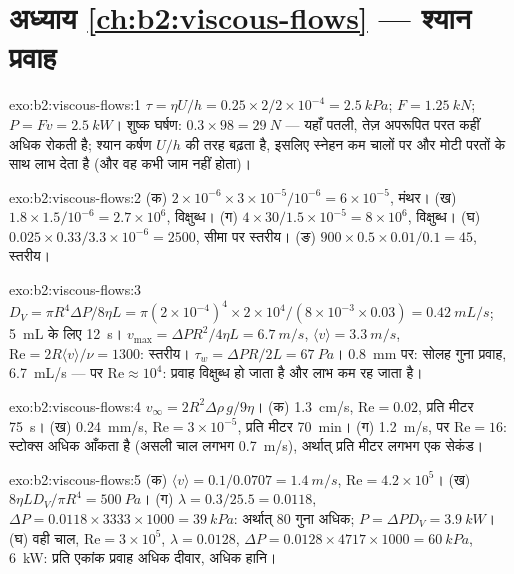 \section*{अध्याय \ref{ch:b2:viscous-flows} --- श्यान प्रवाह}

\begin{solution}{exo:b2:viscous-flows:1}
$\tau = \eta U/h = 0.25 \times 2/2 \times 10^{-4} = \qty{2.5}{kPa}$; $F = \qty{1.25}{kN}$;
$P = Fv = \qty{2.5}{kW}$। शुष्क घर्षण: $0.3 \times 98 = \qty{29}{N}$ --- यहाँ
पतली, तेज़ अपरूपित परत कहीं अधिक रोकती है; श्यान कर्षण
$U/h$ की तरह बढ़ता है, इसलिए स्नेहन कम चालों पर और मोटी परतों के साथ लाभ
देता है (और वह कभी जाम नहीं होता)।
\end{solution}

\begin{solution}{exo:b2:viscous-flows:2}
(क) $2 \times 10^{-6} \times 3 \times 10^{-5}/10^{-6} = 6 \times 10^{-5}$, मंथर। (ख)
$1.8 \times 1.5/10^{-6} = 2.7 \times 10^6$, विक्षुब्ध। (ग) $4 \times 30/1.5 \times 10^{-5}
= 8 \times 10^6$, विक्षुब्ध। (घ) $0.025 \times 0.33/3.3 \times 10^{-6} = 2500$,
सीमा पर स्तरीय। (ङ) $900 \times 0.5 \times 0.01/0.1 = 45$, स्तरीय।
\end{solution}

\begin{solution}{exo:b2:viscous-flows:3}
$D_V = \pi R^4\Delta P/8\eta L = \pi(2 \times 10^{-4})^4 \times 2 \times 10^4/(8 \times 10^{-3}
\times 0.03) = \qty{0.42}{mL/s}$; \qty{5}{mL} के लिए \qty{12}{s}। $v_{\max} = \Delta PR^2/
4\eta L = \qty{6.7}{m/s}$, $\langle v\rangle = \qty{3.3}{m/s}$, $\mathrm{Re} = 2R\langle v
\rangle/\nu = 1300$: स्तरीय। $\tau_w = \Delta PR/2L = \qty{67}{Pa}$। \qty{0.8}{mm} पर:
सोलह गुना प्रवाह, \qty{6.7}{mL/s} --- पर $\mathrm{Re} \approx 10^4$: प्रवाह
विक्षुब्ध हो जाता है और लाभ कम रह जाता है।
\end{solution}

\begin{solution}{exo:b2:viscous-flows:4}
$v_\infty = 2R^2\Delta\rho\,g/9\eta$। (क) \qty{1.3}{cm/s}, $\mathrm{Re} = 0.02$, प्रति मीटर
\qty{75}{s}। (ख) \qty{0.24}{mm/s}, $\mathrm{Re} = 3 \times 10^{-5}$, प्रति
मीटर \qty{70}{min}। (ग) \qty{1.2}{m/s}, पर $\mathrm{Re} = 16$: स्टोक्स अधिक आँकता है (असली
चाल लगभग \qty{0.7}{m/s}), अर्थात् प्रति मीटर लगभग एक सेकंड।
\end{solution}

\begin{solution}{exo:b2:viscous-flows:5}
(क) $\langle v\rangle = 0.1/0.0707 = \qty{1.4}{m/s}$, $\mathrm{Re} = 4.2 \times 10^5$। (ख)
$8\eta LD_V/\pi R^4 = \qty{500}{Pa}$। (ग) $\lambda = 0.3/25.5 = 0.0118$, $\Delta P = 0.0118
\times 3333 \times 1000 = \qty{39}{kPa}$: अर्थात् $80$ गुना अधिक; $P = \Delta PD_V = \qty{3.9}{kW}$।
(घ) वही चाल, $\mathrm{Re} = 3 \times 10^5$, $\lambda = 0.0128$, $\Delta P = 0.0128 \times 4717
\times 1000 = \qty{60}{kPa}$, \qty{6}{kW}: प्रति एकांक प्रवाह अधिक दीवार, अधिक हानि।
\end{solution}

